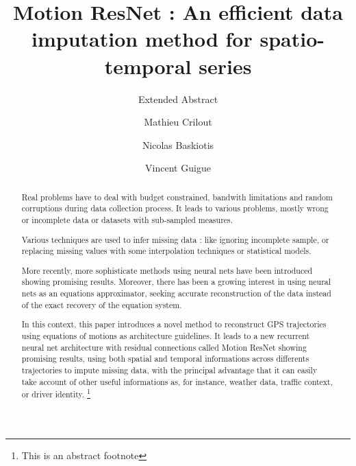\documentclass[sigconf,edbt]{acmart-edbt2020}
\begin{document}
\title{Motion ResNet : An efficient data imputation method for spatio-temporal series}
\subtitle{Extended Abstract}
  

\author{Mathieu Crilout}
\authornote{}
\orcid{}

\author{Nicolas Baskiotis}
\authornote{}

\author{Vincent Guigue}
\authornote{}

\renewcommand{\shortauthors}{}


\begin{abstract}

Real problems have to deal with budget constrained, bandwith limitations and random corruptions during data collection process. It leads to various problems, mostly wrong or incomplete data or datasets with sub-sampled measures.

Various techniques are used to infer missing data : like ignoring incomplete sample, or replacing missing values with some interpolation techniques or statistical models.

More recently, more sophisticate methods using neural nets have been introduced showing promising results.
Moreover, there has been a growing interest in using neural nets as an equations approximator, seeking accurate reconstruction of the data instead of the exact recovery of the equation system.

In this context, this paper introduces a novel method to reconstruct GPS trajectories using equations of motions as architecture guidelines.
It leads to a new recurrent neural net architecture with residual connections called Motion ResNet showing promising results, using both spatial and temporal informations across differents trajectories to impute missing data, with the principal advantage that it can easily take account of other useful informations as, for instance, weather data, traffic context, or driver identity.
\footnote{This is an abstract footnote}
\end{abstract}
\end{document}
